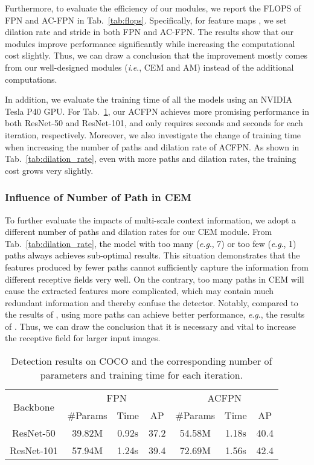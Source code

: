 \documentclass[journal]{IEEEtran}
\newcommand{\ie}{\textit{i}.\textit{e}.\xspace}
\newcommand{\eg}{\textit{e}.\textit{g}.\xspace}
\def\qcr{\fontfamily{qcr}\selectfont}
\def\myblue{\textcolor{black}}
\begin{document}
	Furthermore, to evaluate the efficiency of our modules, we report the FLOPS of FPN and AC-FPN in Tab.~\ref{tab:flops}. Specifically, for feature maps , we set dilation rate  and stride  in both FPN and AC-FPN.
	The results show that our modules improve performance significantly while increasing the computational cost slightly. Thus, we can draw a conclusion that the improvement mostly comes from our well-designed modules (\ie, CEM and AM) instead of the additional computations.
	
	
	In addition, we evaluate the training time of all the models using an NVIDIA Tesla P40 GPU.
    For Tab.~\ref{tab:params}, our ACFPN achieves more promising performance in both ResNet-50 and ResNet-101, and only requires  seconds and  seconds for each iteration, respectively.
    Moreover, we also investigate the change of training time when increasing the number of paths and dilation rate of ACFPN. As shown in Tab.~\ref{tab:dilation_rate}, even with more paths and dilation rates, the training cost grows very slightly.
	
	
	
	
	\subsubsection{Influence of Number of Path in CEM}
	

	
	To further evaluate the impacts of multi-scale context information, we adopt a different \myblue{number of paths} and dilation rates for our CEM module. From Tab.~\ref{tab:dilation_rate}, 
\myblue{the model with too many (\eg, 7) or too few (\eg, 1) paths always achieves sub-optimal results.}
	This situation demonstrates that the features produced by fewer paths cannot sufficiently capture the information from different receptive fields very well. On the contrary, too many paths in CEM will cause the extracted features more complicated, which may contain much redundant information and thereby confuse the detector.
	Notably, compared to the results of , using more paths can achieve better performance, \eg, the results of . Thus, we can draw the conclusion that it is necessary and vital to increase the receptive field for larger input images. 




	\begin{table}[t]
		\centering
\caption{Detection results on COCO {\qcr{test-dev}} and the corresponding number of parameters and training time for each iteration.}
		\resizebox{0.95\linewidth}{!}
		{
			\begin{tabular}{c|ccc|ccc}
				\toprule
				\multirow{2}{*}{Backbone} & \multicolumn{3}{c|}{FPN} & \multicolumn{3}{c}{ACFPN} \\
				& \#Params & Time & AP    & \#Params & Time & AP \\
				\hline    ResNet-50 & 39.82M & 0.92s & 37.2  & 54.58M & 1.18s & 40.4 \\
				ResNet-101 & 57.94M & 1.24s & 39.4  & 72.69M & 1.56s & 42.4 \\
				\bottomrule
			\end{tabular}}
\label{tab:params}\end{table}
\end{document}

